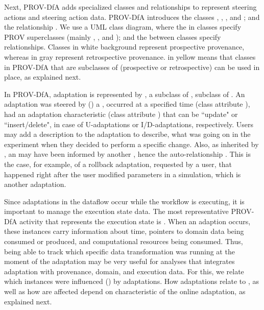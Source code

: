 Next, PROV-DfA adds specialized classes and relationships to represent steering actions
and steering action data.
PROV-DfA introduces the classes ,
,
,
and
;
and the relationship
.
We use a UML class diagram, where the  in classes specify
PROV superclasses (mainly , , and ); and the
 between classes specify relationships.
Classes in white background represent prospective provenance, whereas in gray
represent retrospective provenance.  in yellow means that classes
in PROV-DfA that are subclasses of  (prospective or retrospective)
can be used in place, as explained next.


In PROV-DfA, adaptation is represented by , a subclass of
, subclass of .
An adaptation was steered by
() a ,
occurred at a specified time (class attribute ),
had an adaptation characteristic (class attribute ) that can be
``update" or ``insert/delete", in case of U-adaptations or I/D-adaptations,
respectively.
Users may add a description to the adaptation to describe, \eg{} what was going
on in the experiment when they decided to perform a specific change.
Also, as inherited by , an  may have been
informed by another , hence the auto-relationship .
This is the case, for example, of a rollback adaptation, requested by a user,
that happened right after the user modified parameters in a simulation,
which is another adaptation.

Since adaptations in the dataflow occur while the workflow is executing,
it is important to manage the execution state data.
The most representative PROV-DfA activity that represents the execution state is .
When an adaption occurs, these instances carry information about time,
pointers to domain data being consumed or produced,
and computational resources being consumed.
Thus, being able to track which specific data transformation was running
at the moment of the adaptation may be very useful for analyses that integrates
adaptation with provenance, domain, and execution data.
For this, we relate which  instances were influenced
() by adaptations.
How adaptations relate to , as well as how
 are affected depend on characteristic of the online adaptation,
as explained next.

